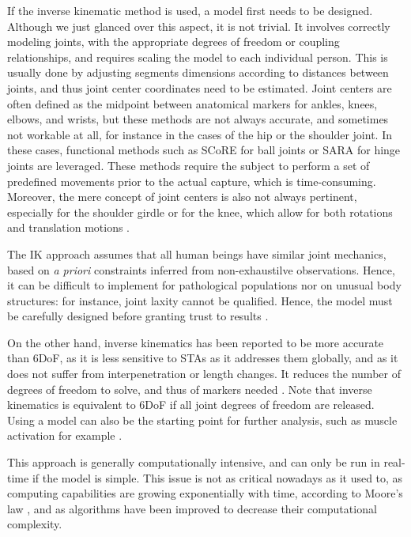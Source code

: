 If the inverse kinematic method is used, a model first needs to be designed. Although we just glanced over this aspect, it is not trivial. It involves correctly modeling joints, with the appropriate degrees of freedom or coupling relationships, and requires scaling the model to each individual person. This is usually done by adjusting segments dimensions according to distances between joints, and thus joint center coordinates need to be estimated. Joint centers are often defined as the midpoint between anatomical markers for ankles, knees, elbows, and wrists, but these methods are not always accurate, and sometimes not workable at all, for instance in the cases of the hip or the shoulder joint. In these cases, functional methods such as SCoRE for ball joints \cite{Ehrig2006} or SARA for hinge joints \cite{Ehrig2007} are leveraged. These methods require the subject to perform a set of predefined movements prior to the actual capture, which is time-consuming. Moreover, the mere concept of joint centers is also not always pertinent, especially for the shoulder girdle or for the knee, which allow for both rotations and translation motions \cite{Seth2010}. 

The IK approach assumes that all human beings have similar joint mechanics, based on \textit{a priori} constraints inferred from non-exhaustilve observations. Hence, it can be difficult to implement for pathological populations nor on unusual body structures: for instance, joint laxity cannot be qualified. Hence, the model must be carefully designed before granting trust to results \cite{Hicks2015}. 

On the other hand, inverse kinematics has been reported to be more accurate than 6DoF, as it is less sensitive to STAs as it addresses them globally, and as it does not suffer from interpenetration or length changes. It reduces the number of degrees of freedom to solve, and thus of markers needed \cite{Slater2018}. Note that inverse kinematics is equivalent to 6DoF if all joint degrees of freedom are released. Using a model can also be the starting point for further analysis, such as muscle activation for example \cite{Robinson2013,Kainz2016}.

This approach is generally computationally intensive, and can only be run in real-time if the model is simple. This issue is not as critical nowadays as it used to, as computing capabilities are growing exponentially with time, according to Moore's law \cite{Moore1965}, and as algorithms have been improved to decrease their computational complexity. 

